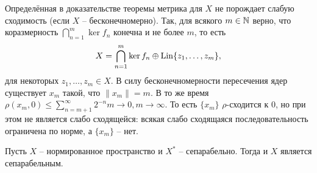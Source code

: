 \begin{note}
    Определённая в доказательстве теоремы метрика для $X$ не порождает слабую сходимость (если $X$ -- бесконечномерно).
    Так, для всякого $m \in \mathbb{N}$ верно, что коразмерность $\bigcap_{n = 1}^{m} \ker f_n$ конечна и не более $m$, то есть
    \[
        X = \bigcap_{n = 1}^{m} \ker f_n \oplus \operatorname{Lin}\{z_1, \ldots, z_m\},
    \]
    для некоторых $z_1, \ldots, z_m \in X$.
    В силу бесконечномерности пересечения ядер существует $x_m$ такой, что $\|x_m\| = m$.
    В то же время $\rho(x_m, 0) \leq \sum_{n = m + 1}^{\infty} 2^{-n}m \rightarrow 0, m \rightarrow \infty$.
    То есть $\{x_m\}$ $\rho$-сходится к $0$, но при этом не является слабо сходящейся: всякая слабо сходящаяся последовательность ограничена по норме, а $\{x_m\}$ -- нет.
\end{note}
\begin{proposition}\label{prop:conjugate_separability}
    Пусть $X$ -- нормированное пространство и $X^*$ -- сепарабельно.
    Тогда и $X$ является сепарабельным.
\end{proposition}
